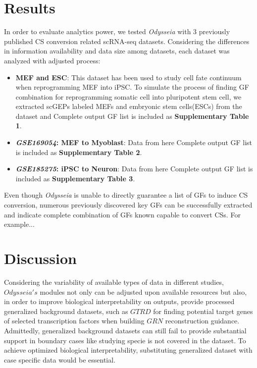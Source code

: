 \documentclass[fleqn,10pt]{wlscirep}
\begin{document}
\section*{Results}
\label{res}
In order to evaluate analytics power, we tested \emph{Odysseia} with 3 previously published CS conversion related scRNA-seq datasets.
Considering the differences in information availability and data size among datasets, each dataset was analyzed with adjusted process:
\begin{itemize}
\setlength\itemsep{0em}
\item \textbf{MEF and ESC}:
This dataset has been used to study cell fate continuum when reprogramming MEF into iPSC.\cite{mef_ipsc_cas}
To simulate the process of finding GF combination for reprogramming somatic cell into pluripotent stem cell, we extracted scGEPs labeled MEFs and embryonic stem cells(ESCs) from the dataset and
Complete output GF list is included as \textbf{Supplementary Table 1}.
\item \textbf{\emph{GSE169054}: MEF to Myoblast}:
Data from here\cite{mef_iMPC_ETH}
Complete output GF list is included as \textbf{Supplementary Table 2}.
\item \textbf{\emph{GSE185275}: iPSC to Neuron}:
Data from here\cite{ips_neuron_ascl1}
Complete output GF list is included as \textbf{Supplementary Table 3}.
\end{itemize}

Even though \emph{Odysseia} is unable to directly guarantee a list of GFs to induce CS conversion, numerous previously discovered key GFs can be successfully extracted and indicate complete combination of GFs known capable to convert CSs.
For example...\cite{ips7f}

\section*{Discussion}
\label{disc}
Considering the variability of available types of data in different studies, $Odysseia's$ modules not only can be adjusted upon available resources but also, in order to improve biological interpretability on outputs, provide processed generalized background datasets, such as $GTRD$\cite{gkaa1057} for finding potential target genes of selected transcription factors when building $GRN$ reconstruction guidance. Admittedly, generalized background datasets can still fail to provide substantial support in boundary cases like studying specie is not covered in the dataset. To achieve optimized biological interpretability, substituting generalized dataset with case specific data would be essential.
\end{document}
